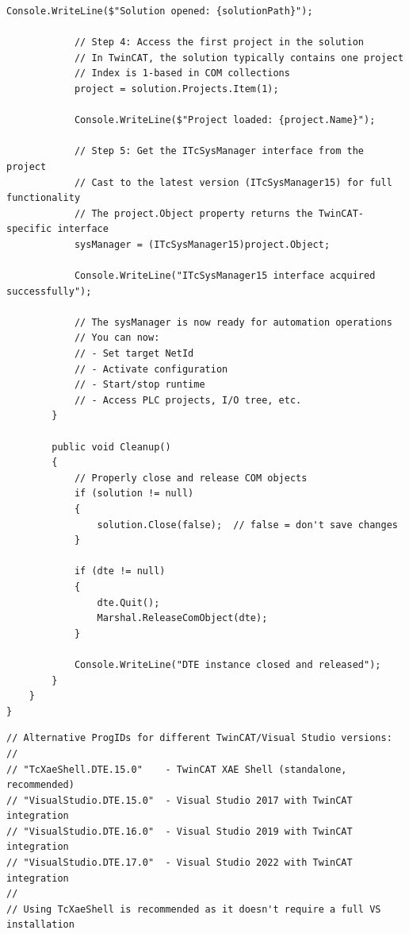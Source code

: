 \documentclass[11pt,a4paper]{article}
\begin{document}
\begin{lstlisting}[style=csharpstyle]
            Console.WriteLine($"Solution opened: {solutionPath}");
            
            // Step 4: Access the first project in the solution
            // In TwinCAT, the solution typically contains one project
            // Index is 1-based in COM collections
            project = solution.Projects.Item(1);
            
            Console.WriteLine($"Project loaded: {project.Name}");
            
            // Step 5: Get the ITcSysManager interface from the project
            // Cast to the latest version (ITcSysManager15) for full functionality
            // The project.Object property returns the TwinCAT-specific interface
            sysManager = (ITcSysManager15)project.Object;
            
            Console.WriteLine("ITcSysManager15 interface acquired successfully");
            
            // The sysManager is now ready for automation operations
            // You can now:
            // - Set target NetId
            // - Activate configuration
            // - Start/stop runtime
            // - Access PLC projects, I/O tree, etc.
        }
        
        public void Cleanup()
        {
            // Properly close and release COM objects
            if (solution != null)
            {
                solution.Close(false);  // false = don't save changes
            }
            
            if (dte != null)
            {
                dte.Quit();
                Marshal.ReleaseComObject(dte);
            }
            
            Console.WriteLine("DTE instance closed and released");
        }
    }
}
\end{lstlisting}

\begin{lstlisting}[style=csharpstyle]
// Alternative ProgIDs for different TwinCAT/Visual Studio versions:
//
// "TcXaeShell.DTE.15.0"    - TwinCAT XAE Shell (standalone, recommended)
// "VisualStudio.DTE.15.0"  - Visual Studio 2017 with TwinCAT integration
// "VisualStudio.DTE.16.0"  - Visual Studio 2019 with TwinCAT integration
// "VisualStudio.DTE.17.0"  - Visual Studio 2022 with TwinCAT integration
//
// Using TcXaeShell is recommended as it doesn't require a full VS installation
\end{lstlisting}
\end{document}
